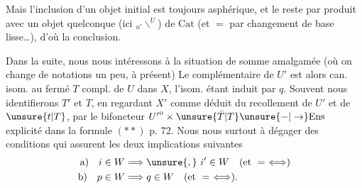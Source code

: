 Mais l'inclusion d'un objet initial est toujours
asphérique, et le reste par produit avec un
objet quelconque (ici $\mathord{}_{u'}\backslash^{U}$) de $\mathrm{Cat}$
(et $=$ par  changement de base lisse\ldots),
d'où la conclusion. \unsure{$\backslash$}

Dans la suite, nous nous intéressons
 à la situation de somme amalgamée
(où on change de notations un peu, à
présent)
Le  complémentaire de $U'$  est alors
can. isom. au fermé $T$ compl. de $U$ dans
$X$, l'isom. étant induit par $q$. Souvent
nous identifierons $T'$ et $T$,  en regardant
$X'$ comme déduit du recollement de
$U'$ et de $\unsure{t|T}$, par le bifoncteur $\mathord{U'}^{\mathrm o}\times\unsure{\bar T|T}\unsure{-|\to}\mathrm{Ens}$
explicité dans la formule $(**)$ p. 72. Nous
nous  surtout à dégager des conditions
qui assurent les deux implications suivantes
\[
\begin{aligned}
\text{a)}\quad i\in W&\Longrightarrow\unsure{,}\ i'\in W\quad(\text{et }=\ \Longleftrightarrow)\\
\text{b)}\quad p\in W&\Longrightarrow q\in W\quad(\text{et }=\ \Longleftrightarrow).
\end{aligned}
\]
